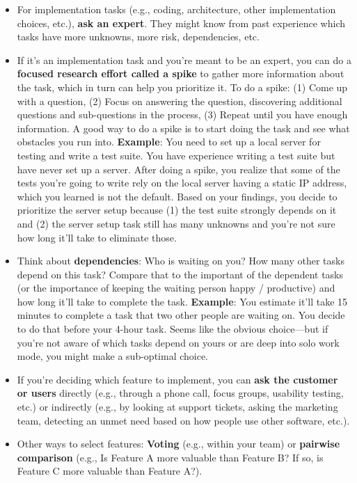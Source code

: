 \begin{itemize}
    \item For implementation tasks (e.g., coding, architecture, other implementation choices, etc.), \textbf{ask an expert}. They might know from past experience which tasks have more unknowns, more risk, dependencies, etc.\\
    \item If it's an implementation task and you're meant to be an expert, you can do a \textbf{focused research effort called a spike}\marginpar{\spikeDef} to gather more information about the task, which in turn can help you prioritize it. To do a spike: (1) Come up with a question, (2) Focus on answering the question, discovering additional questions and sub-questions in the process, (3) Repeat until you have enough information. A good way to do a spike is to start doing the task and see what obstacles you run into. \textbf{Example}: You need to set up a local server for testing and write a test suite. You have experience writing a test suite but have never set up a server. After doing a spike, you realize that some of the tests you're going to write rely on the local server having a static IP address, which you learned is not the default. Based on your findings, you decide to prioritize the server setup because (1) the test suite strongly depends on it and (2) the server setup task still has many unknowns and you're not sure how long it'll take to eliminate those. \\
    \item Think about \textbf{dependencies}: Who is waiting on you? How many other tasks depend on this task? Compare that to the important of the dependent tasks (or the importance of keeping the waiting person happy / productive) and how long it'll take to complete the task. \textbf{Example}: You estimate it'll take 15 minutes to complete a task that two other people are waiting on. You decide to do that before your 4-hour task. Seems like the obvious choice---but if you're not aware of which tasks depend on yours or are deep into solo work mode, you might make a sub-optimal choice.\\
    \item If you're deciding which feature to implement, you can \textbf{ask the customer or users} directly (e.g., through a phone call, focus groups\marginpar{\focusGroupDef\margindivider}, usability testing\marginpar{\usabilityTestingDef\margindivider}\marginpar{\estimationDef\margindivider}\marginpar{\storyPointsDef}, etc.) or indirectly (e.g., by looking at support tickets, asking the marketing team, detecting an unmet need based on how people use other software, etc.).\\
    \item Other ways to select features: \textbf{Voting} (e.g., within your team) or \textbf{pairwise comparison} (e.g., Is Feature A more valuable than Feature B? If so, is Feature C more valuable than Feature A?).\\
\end{itemize}
